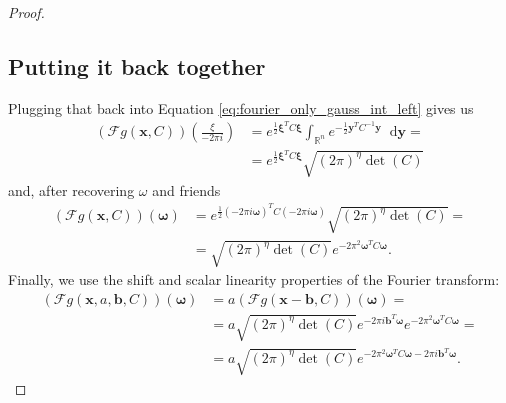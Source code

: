 \documentclass{paper}
\newcommand{\F}{\ensuremath{\mathcal{F}}}
\newcommand{\vr}[1]{\ensuremath{\boldsymbol{#1}}}
\newcommand*\diff{\mathop{}\!\mathrm{d}}
\newcommand{\omegavec}[0]{\ensuremath{\vr{\omega{}}}}
\newcommand{\xivec}[0]{\ensuremath{\vr{\xi{}}}}
\newcommand{\bvec}[0]{\ensuremath{\vr{b}}}
\newcommand{\yvec}[0]{\ensuremath{\vr{y}}}
\begin{document}
\begin{proof}
\subsection*{Putting it back together}
Plugging that back into Equation \ref{eq:fourier_only_gauss_int_left} gives us
\begin{align*}
	(\F g(\vr{x}, C))(\frac{\xi}{-2 \pi i})
	&= e^{\frac{1}{2} \xivec^T C \xivec} \int_{\mathbb{R}^n} e^{-\frac{1}{2} \yvec^T C^{-1} \yvec}  \diff \yvec = \\
	&= e^{\frac{1}{2} \xivec^T C \xivec} \sqrt{(2 \pi)^\eta \det(C)}
\end{align*}
and, after recovering $\omega$ and friends
\begin{align*}
(\F g(\vr{x}, C))(\omegavec)
&= e^{\frac{1}{2} (-2 \pi i \omegavec)^T C (-2 \pi i \omegavec)} \sqrt{(2 \pi)^\eta \det(C)} = \\
&= \sqrt{(2 \pi)^\eta \det(C)} e^{-2 \pi^2 \omegavec^T C \omegavec}.
\end{align*}
Finally, we use the shift and scalar linearity properties of the Fourier transform:
\begin{align}
(\F g(\vr{x}, a, \bvec, C))(\omegavec) &= a (\F g(\vr{x} - \bvec, C))(\omegavec) = \nonumber \\
&= a \sqrt{(2 \pi)^\eta \det(C)} e^{-2\pi i \bvec^T \omegavec} e^{-2 \pi^2 \omegavec^T C \omegavec} =\nonumber \\
&= a \sqrt{(2 \pi)^\eta \det(C)} e^{-2 \pi^2 \omegavec^T C \omegavec - 2\pi i \bvec^T \omegavec}.
\end{align}

\end{proof}

\clearpage
\end{document}

